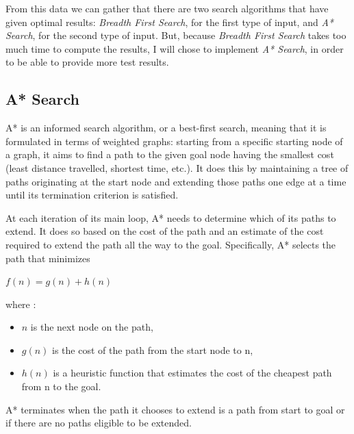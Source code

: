 \documentclass{article}
\begin{document}
\bigskip

From this data we can gather that there are two search algorithms that have given optimal results: \emph{Breadth First Search}, for the first type of input, and \emph{A* Search}, for the second type of input. But, because \emph{Breadth First Search} takes too much time to compute the results, I will chose to implement \emph{A* Search}, in order to be able to provide more test results.

\subsection{A* Search}
\label{astar_search}

A* is an informed search algorithm, or a best-first search, meaning that it is formulated in terms of weighted graphs: starting from a specific starting node of a graph, it aims to find a path to the given goal node having the smallest cost (least distance travelled, shortest time, etc.). It does this by maintaining a tree of paths originating at the start node and extending those paths one edge at a time until its termination criterion is satisfied.

At each iteration of its main loop, A* needs to determine which of its paths to extend. It does so based on the cost of the path and an estimate of the cost required to extend the path all the way to the goal. Specifically, A* selects the path that minimizes

\begin{center}
    $f(n) = g(n) + h(n)$
\end{center}

where :
\begin{itemize}
    \item $n$ is the next node on the path,
    \item $g(n)$ is the cost of the path from the start node to n,
    \item $h(n)$ is a heuristic function that estimates the cost of the cheapest path from n to the goal.
\end{itemize}

 A* terminates when the path it chooses to extend is a path from start to goal or if there are no paths eligible to be extended. 
\end{document}
